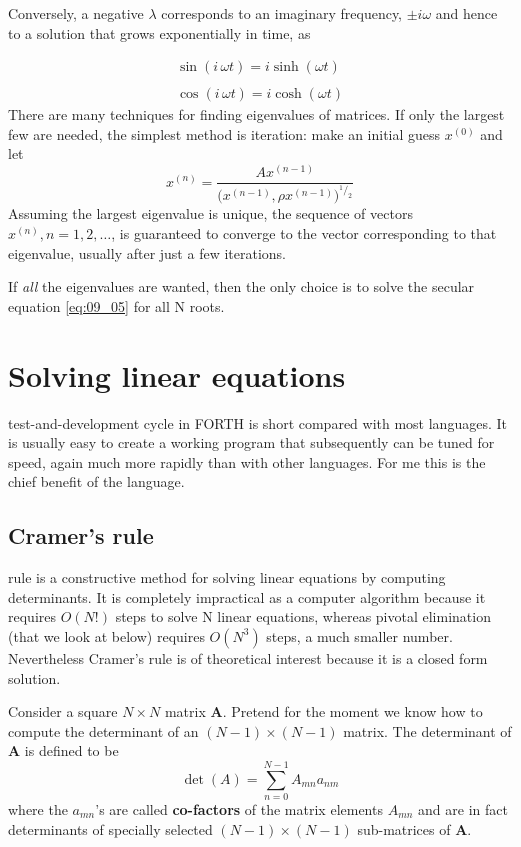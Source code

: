 Conversely, a negative $\lambda$ corresponds to an imaginary frequency,
$\pm i \omega$ and hence to a solution that grows exponentially in time, as

\begin{align}
    \label{eq:09_09}
\sin(i\, \omega t) = i \sinh(\omega t)\nonumber \\
\\
\cos(i\, \omega t) = i \cosh(\omega t)\nonumber
\end{align}
There are many techniques for finding eigenvalues of matrices.
If only the largest few are needed, the simplest method is iteration: make an
initial guess $x^{(0)}$ and let
\begin{equation*}
    x^{(n)}=\frac{A x^{(n-1)}}{\Big(x^{(n-1)}, \rho x^{(n-1)}\Big)^{^1/_2}}
\end{equation*}
Assuming the largest eigenvalue is unique, the sequence of vectors $x^{(n)} , n = 1, 2,\dotsc$, is guaranteed to converge to the vector
corresponding to that eigenvalue, usually after just a few iterations.

If \textit{all} the eigenvalues are wanted, then the only choice is to solve
the secular equation \ref{eq:09_05} for all N roots.

\section{Solving linear equations}
 test-and-development cycle in FORTH is short compared
with most languages. It is usually easy to create a working
program that subsequently can be tuned for speed, again much
more rapidly than with other languages. For me this is the chief
benefit of the language.

\subsection{Cramer's rule}

 rule is a constructive method for solving linear equations
by computing determinants. It is completely impractical
as a computer algorithm because it requires $O(N!)$ steps to solve
N linear equations, whereas pivotal elimination (that we look at
below) requires $O(N^3)$ steps, a much smaller number. Nevertheless Cramer's
rule is of theoretical interest because it is a closed form solution.

Consider a square $N\times N$ matrix \textbf{A}. Pretend for the moment we
know how to compute the determinant of an $(N-1)\times(N-1)$
matrix. The determinant of \textbf{A} is defined to be
\begin{equation}
    \label{eq:09_10}
    \det(A) = \sum_{n=0}^{N-1}A_{mn} a_{nm} 
\end{equation}
where the $a_{mn}$'s are called \textbf{co-factors} of the matrix elements $A_{mn}$
and are in fact determinants of specially selected $(N-1)\times(N-1)$
sub-matrices of \textbf{A}.

